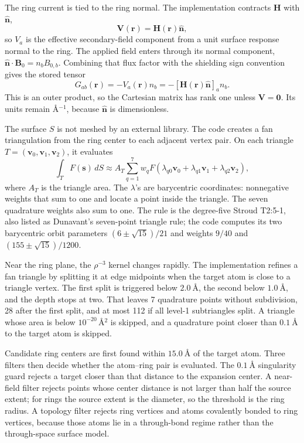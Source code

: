 \documentclass[11pt]{article}
\begin{document}
The ring current is tied to the ring normal. The implementation contracts
\(\bm H\) with \(\hat{\bm n}\),
\begin{equation}
  \bm V(\bm r)=\bm H(\bm r)\hat{\bm n},
  \label{eq:v-field}
\end{equation}
so \(V_a\) is the effective secondary-field component from a unit surface
response normal to the ring. The applied field enters through its normal
component, \(\hat{\bm n}\cdot\bm B_0=n_bB_{0,b}\). Combining that flux factor
with the shielding sign convention gives the stored tensor
\begin{equation}
  G_{ab}(\bm r)=-V_a(\bm r)n_b
  =-\left[\bm H(\bm r)\hat{\bm n}\right]_a n_b .
  \label{eq:g-kernel}
\end{equation}
This is an outer product, so the Cartesian matrix has rank one unless
\(\bm V=\bm 0\). Its units remain \(\si{\angstrom^{-1}}\), because
\(\hat{\bm n}\) is dimensionless.

The surface \(S\) is not meshed by an external library. The code creates a fan
triangulation from the ring center to each adjacent vertex pair. On each
triangle \(T=(\bm v_0,\bm v_1,\bm v_2)\), it evaluates
\begin{equation}
  \int_T F(\bm s)\,dS
  \approx
  A_T\sum_{q=1}^{7}w_q
  F(\lambda_{q0}\bm v_0+\lambda_{q1}\bm v_1+\lambda_{q2}\bm v_2),
  \label{eq:quadrature}
\end{equation}
where \(A_T\) is the triangle area. The \(\lambda\)'s are barycentric
coordinates: nonnegative weights that sum to one and locate a point inside the
triangle. The seven quadrature weights also sum to one. The rule is the
degree-five Stroud T2:5-1, also listed as Dunavant's seven-point triangle rule;
the code computes its two barycentric orbit parameters
\((6\pm\sqrt{15})/21\) and weights \(9/40\) and
\((155\pm\sqrt{15})/1200\).

Near the ring plane, the \(\rho^{-3}\) kernel changes rapidly. The
implementation refines a fan triangle by splitting it at edge midpoints when
the target atom is close to a triangle vertex. The first split is triggered
below \(\SI{2.0}{\angstrom}\), the second below \(\SI{1.0}{\angstrom}\), and
the depth stops at two. That leaves 7 quadrature points without subdivision,
28 after the first split, and at most 112 if all level-1 subtriangles split. A
triangle whose area is below \(10^{-20}\,\si{\angstrom^2}\) is skipped, and a
quadrature point closer than \(\SI{0.1}{\angstrom}\) to the target atom is
skipped.

Candidate ring centers are first found within \(\SI{15.0}{\angstrom}\) of the
target atom. Three filters then decide whether the atom--ring pair is
evaluated. The \(\SI{0.1}{\angstrom}\) singularity guard rejects a target
closer than that distance to the expansion center. A near-field filter rejects
points whose center distance is not larger than half the source extent; for
rings the source extent is the diameter, so the threshold is the ring radius. A
topology filter rejects ring vertices and atoms covalently bonded to ring
vertices, because those atoms lie in a through-bond regime rather than the
through-space surface model.
\end{document}
